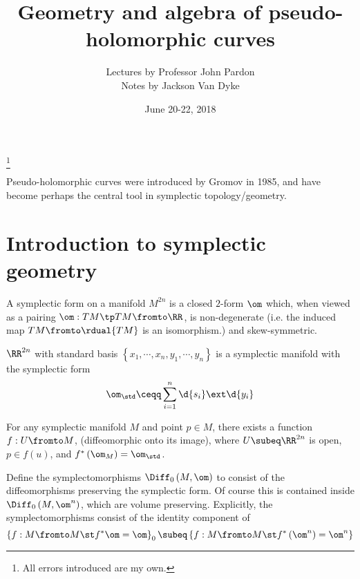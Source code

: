 \documentclass{amsart}
\begin{document}
\title{Geometry and algebra of pseudo-holomorphic curves}
\author{Lectures by Professor John Pardon\\
Notes by Jackson Van Dyke}
\thanks{All errors introduced are my own.}
\date{June 20-22, 2018}
\maketitle

Pseudo-holomorphic curves were 
introduced by Gromov in 1985, and have become perhaps the central
tool in symplectic topology/geometry.

\section{Introduction to symplectic geometry}

\begin{defn}
A symplectic form on a manifold $M^{2n}$
is a closed $2$-form $\om$ which, when viewed as a pairing
$\om:TM\tp TM\fromto \RR$, is non-degenerate
(i.e. the induced map 
$TM\fromto \rdual{TM}$ is an isomorphism.)
and skew-symmetric.
\end{defn}

\begin{exm}
$\RR^{2n}$ with standard basis
$\left\{ x_1 , \cdots , x_n , y_1 , \cdots , y_n \right\}$
is a symplectic manifold with the symplectic form
\begin{equation}
\om_\std \ceqq \sum_{i = 1}^n 
\d{s_i} \ext \d{y_i}
\end{equation}
\end{exm}

\begin{thm}[Darboux]
For any symplectic manifold $M$ and point $p\in M$, 
there exists a function $f:U\fromto M$, (diffeomorphic onto its image),
where $U\subeq \RR^{2n}$ is open, $p\in f\left( u \right)$, and
$f^*\left( \om_M \right)  = \om_\std$.
\end{thm}

Define the symplectomorphisms 
$\Diff_0\left( M , \om \right)$ 
to consist of the diffeomorphisms
preserving the symplectic form.
Of course this is contained inside $\Diff_0\left( M  , \om^n \right)$, 
which are volume preserving.
Explicitly, the symplectomorphisms consist of the identity component of
\begin{equation}
\left\{ f:M\fromto M \st f^* \om = \om \right\}_0
\subeq 
\left\{ f:M\fromto M \st f^*\left( \om^n \right)= \om^n \right\}
\end{equation}
\end{document}
